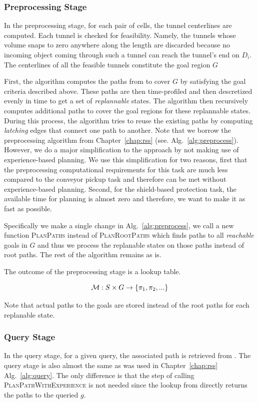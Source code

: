 \documentclass[a4paper]{report}
\begin{document}
\subsubsection{Preprocessing Stage}
In the preprocessing stage, for each pair of cells, the tunnel centerlines are computed. Each tunnel is checked for feasibility. Namely, the tunnels whose volume snaps to zero anywhere along the length are discarded because no incoming object coming through such a tunnel can reach the tunnel's end on $D_i$. The centerlines of all the feasible tunnels constitute the goal region $G$

First, the algorithm computes the paths from \Shome to cover $G$ by satisfying the goal criteria described above. These paths are then time-profiled and then descretized evenly in time to get a set of \emph{replannable} states. The algorithm then recursively computes additional paths to cover the goal regions for these replannable states. During this process, the algorithm tries to reuse the existing paths by computing \emph{latching} edges that connect one path to another. Note that we borrow the preprocessing algorithm from Chapter~\ref{chap:rss} (see. Alg.~\ref{alg:preprocess}). However, we do a major simplification to the approach by not making use of experience-based planning. We use this simplification for two reasons, first that the preprocessing computational requirements for this task are much less compared to the conveyor pickup task and therefore can be met without experience-based planning. Second, for the shield-based protection task, the available time for planning is almost zero and therefore, we want to make it as fast as possible.

Specifically we make a single change in Alg.~\ref{alg:preprocess}, we call a new function \textsc{PlanPaths} instead of \textsc{PlanRootPaths} which finds paths to all \emph{reachable} goals in $G$ and thus we process the replanable states on those paths instead of root paths. The rest of the algorithm remains as is.

The outcome of the preprocessing stage is a lookup table.

$$
\mathcal{M} : S \times G \rightarrow \{\pi_1, \pi_2, ...\}
$$

Note that actual paths to the goals are stored instead of the root paths for each replanable state.

\subsubsection{Query Stage}
In the query stage, for a given query, the associated path is retrieved from \calM.
The query stage is also almost the same as was used in Chapter~\ref{chap:rss} Alg.~\ref{alg:query}. The only difference is that the step of calling \textsc{PlanPathWithExperience} is not needed since the lookup from \calM directly returns the paths to the queried $g$.
\end{document}
